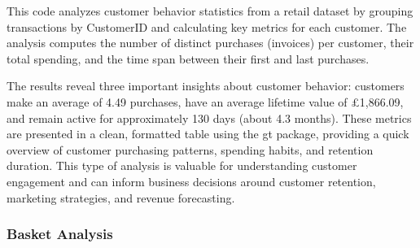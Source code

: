 \documentclass[
]{article}
\newenvironment{Shaded}{\begin{snugshade}}{\end{snugshade}}
\newcommand{\AttributeTok}[1]{\textcolor[rgb]{0.13,0.29,0.53}{#1}}
\newcommand{\CommentTok}[1]{\textcolor[rgb]{0.56,0.35,0.01}{\textit{#1}}}
\newcommand{\DecValTok}[1]{\textcolor[rgb]{0.00,0.00,0.81}{#1}}
\newcommand{\FunctionTok}[1]{\textcolor[rgb]{0.13,0.29,0.53}{\textbf{#1}}}
\newcommand{\NormalTok}[1]{#1}
\newcommand{\OtherTok}[1]{\textcolor[rgb]{0.56,0.35,0.01}{#1}}
\newcommand{\SpecialCharTok}[1]{\textcolor[rgb]{0.81,0.36,0.00}{\textbf{#1}}}
\newcommand{\StringTok}[1]{\textcolor[rgb]{0.31,0.60,0.02}{#1}}
\begin{document}
This code analyzes customer behavior statistics from a retail dataset by
grouping transactions by CustomerID and calculating key metrics for each
customer. The analysis computes the number of distinct purchases
(invoices) per customer, their total spending, and the time span between
their first and last purchases.

The results reveal three important insights about customer behavior:
customers make an average of 4.49 purchases, have an average lifetime
value of £1,866.09, and remain active for approximately 130 days (about
4.3 months). These metrics are presented in a clean, formatted table
using the gt package, providing a quick overview of customer purchasing
patterns, spending habits, and retention duration. This type of analysis
is valuable for understanding customer engagement and can inform
business decisions around customer retention, marketing strategies, and
revenue forecasting.\newpage

\subsubsection{Basket Analysis}\label{basket-analysis}

\begin{Shaded}
\end{Shaded}
\end{document}
